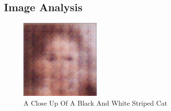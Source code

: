 \documentclass{article}%
\begin{document}
%
\subsection{Image Analysis}%
\label{subsec:ImageAnalysis}%


\begin{figure}[h!]%
\centering%
\includegraphics[width=150px]{500_fake_images/samples_5_344.png}%
\caption{A Close Up Of A Black And White Striped Cat}%
\end{figure}

%
\end{document}
